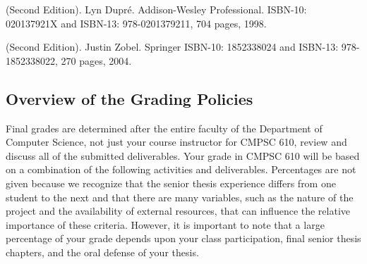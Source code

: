  (Second Edition). Lyn Dupr\'e. Addison-Wesley
Professional.  ISBN-10: 020137921X and ISBN-13: 978-0201379211, 704 pages, 1998.


 (Second Edition). Justin Zobel. Springer ISBN-10: 1852338024 and ISBN-13:
978-1852338022, 270 pages, 2004.


\vspace*{-.15in}
\subsection*{Overview of the Grading Policies}

Final grades are determined after the entire faculty of the Department of Computer Science, not just your course
instructor for CMPSC 610, review and discuss all of the submitted deliverables. Your grade in CMPSC 610 will be based on
a combination of the following activities and deliverables. Percentages are not given because we recognize that the
senior thesis experience differs from one student to the next and that there are many variables, such as the nature of
the project and the availability of external resources, that can influence the relative importance of these criteria.
However, it is important to note that a large percentage of your grade depends upon your class participation, final
senior thesis chapters, and the oral defense of your thesis.

\vspace*{-.05in}

